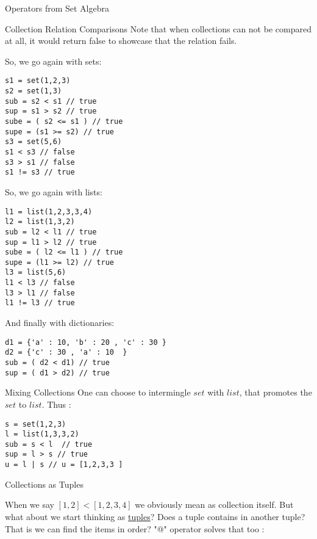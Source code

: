 \begin{section}{Operators from Set Algebra}
\begin{subsection}{Collection Relation Comparisons}
Note that when collections can not be compared at all, 
it would return false to showcase that the relation fails.

So, we go again with sets:

\begin{center}\begin{minipage}{\linewidth}
\begin{lstlisting}[style=JexlStyle]
s1 = set(1,2,3)
s2 = set(1,3)
sub = s2 < s1 // true  
sup = s1 > s2 // true 
sube = ( s2 <= s1 ) // true  
supe = (s1 >= s2) // true 
s3 = set(5,6)
s1 < s3 // false 
s3 > s1 // false 
s1 != s3 // true
\end{lstlisting}
\end{minipage}\end{center}

So, we go again with lists:

\begin{lstlisting}[style=JexlStyle]
l1 = list(1,2,3,3,4)
l2 = list(1,3,2)
sub = l2 < l1 // true  
sup = l1 > l2 // true 
sube = ( l2 <= l1 ) // true  
supe = (l1 >= l2) // true 
l3 = list(5,6)
l1 < l3 // false 
l3 > l1 // false 
l1 != l3 // true
\end{lstlisting}

And finally with dictionaries:

\begin{lstlisting}[style=JexlStyle]
d1 = {'a' : 10, 'b' : 20 , 'c' : 30 }
d2 = {'c' : 30 , 'a' : 10  }
sub = ( d2 < d1) // true 
sup = ( d1 > d2) // true
\end{lstlisting}
\end{subsection}

\begin{subsection}{Mixing Collections}
One can choose to intermingle $set$ with $list$, that promotes the $set$ to $list$.
Thus :

\begin{lstlisting}[style=JexlStyle]
s = set(1,2,3)
l = list(1,3,3,2)
sub = s < l  // true  
sup = l > s // true 
u = l | s // u = [1,2,3,3 ]
\end{lstlisting}

\end{subsection}


\begin{subsection}{Collections as Tuples}

When we say $[1,2] < [1,2,3,4] $ we obviously mean as collection itself.
But what about we start thinking as \href{https://en.wikipedia.org/wiki/Tuple}{tuples}?
Does a tuple contains in another tuple? That is we can find the items in order? 
"@" operator solves that too :


\end{subsection}
\end{section}
